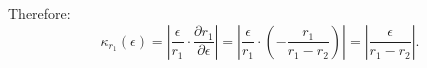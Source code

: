 \documentclass[reqno]{exam}
\begin{document}
\begin{questions}
\begin{solution}
    Therefore:
    $$\kappa_{r_1}(\epsilon) = \left|\frac{\epsilon}{r_1} \cdot \frac{\partial r_1}{\partial \epsilon}\right| = \left|\frac{\epsilon}{r_1} \cdot \left(-\frac{r_1}{r_1-r_2}\right)\right| = \left|\frac{\epsilon}{r_1-r_2}\right|.$$
  \end{solution}


\end{questions}
\end{document}
